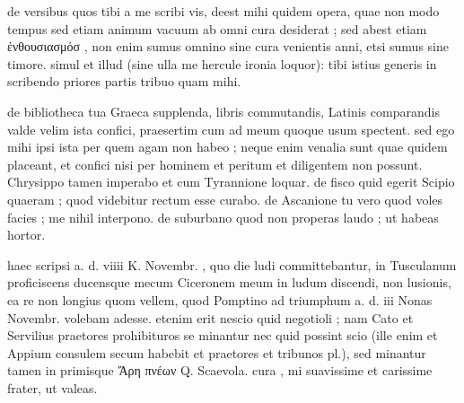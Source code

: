  de versibus quos tibi a me scribi vis, deest mihi quidem opera, quae non modo tempus sed etiam animum vacuum ab omni cura desiderat ; sed abest etiam ἐνθουσιασμόσ , non enim sumus omnino sine cura venientis anni, etsi sumus sine timore. simul et illud (sine ulla me hercule ironia loquor): tibi istius generis in scribendo priores partis tribuo quam mihi.

 de bibliotheca tua Graeca supplenda, libris commutandis, Latinis comparandis valde velim ista confici, praesertim cum ad meum quoque usum spectent. sed ego mihi ipsi ista per quem agam non habeo ; neque enim venalia sunt quae quidem placeant, et confici nisi per hominem et peritum et diligentem non possunt. Chrysippo tamen imperabo et cum Tyrannione loquar. de fisco quid egerit Scipio quaeram ; quod videbitur rectum esse curabo. de Ascanione tu vero quod voles facies ; me nihil interpono. de suburbano quod non properas laudo ; ut habeas hortor.

 haec scripsi a. d. viiii K. Novembr. , quo die ludi committebantur, in Tusculanum proficiscens ducensque mecum Ciceronem meum in ludum discendi, non lusionis, ea re non longius quom vellem, quod Pomptino ad triumphum a. d. iii Nonas Novembr. volebam adesse. etenim erit nescio quid negotioli ; nam Cato et Servilius praetores prohibituros se minantur nec quid possint scio (ille enim et Appium consulem secum habebit et praetores et tribunos pl.), sed minantur tamen in primisque Ἄρη πνέων Q. Scaevola. cura , mi suavissime et carissime frater, ut valeas.
